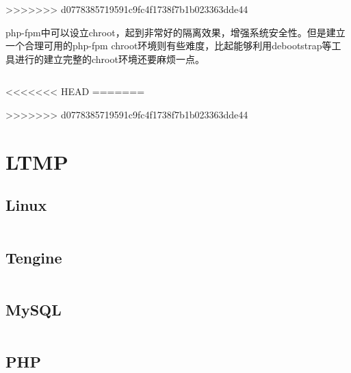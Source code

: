 >>>>>>> d0778385719591c9fc4f1738f7b1b023363dde44

php-fpm中可以设立chroot，起到非常好的隔离效果，增强系统安全性。但是建立一个合理可用的php-fpm chroot环境则有些难度，比起能够利用debootstrap等工具进行的建立完整的chroot环境还要麻烦一点。




\begin{lstlisting}[language=bash]

\end{lstlisting}



<<<<<<< HEAD
=======


>>>>>>> d0778385719591c9fc4f1738f7b1b023363dde44
\chapter{LTMP}



\section{Linux}



\begin{lstlisting}[language=bash]

\end{lstlisting}


\section{Tengine}


\begin{lstlisting}[language=bash]

\end{lstlisting}


\section{MySQL}


\begin{lstlisting}[language=bash]

\end{lstlisting}




\section{PHP}


\begin{lstlisting}[language=bash]

\end{lstlisting}



